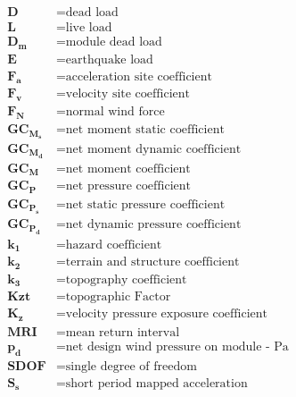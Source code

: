 \documentclass[12pt,notitle,letterpaper]{report}
\begin{document}
\vspace{-.4in}
\begingroup
\allowdisplaybreaks
\begin{align*}
    \bm{D}       & = \textrm{dead load}                               \\
    \bm{L}       & = \textrm{live load}                               \\
    \bm{D_m}     & = \textrm{module dead load}                        \\
    \bm{E}       & = \textrm{earthquake load}                         \\
    \bm{F_a}     & = \textrm{acceleration site coefficient}           \\
    \bm{F_v}     & = \textrm{velocity site coefficient}               \\
    \bm{F_N}     & = \textrm{normal wind force}                       \\
    \bm{GC_M_s}  & = \textrm{net moment static coefficient}           \\
    \bm{GC_M_d}  & = \textrm{net moment dynamic coefficient}          \\
    \bm{GC_M}    & = \textrm{net moment coefficient}                  \\
    \bm{GC_P}    & = \textrm{net pressure coefficient}                \\
    \bm{GC_P_s}  & = \textrm{net static pressure coefficient}         \\
    \bm{GC_P_d}  & = \textrm{net dynamic pressure coefficient}        \\
    \bm{k_1}     & = \textrm{hazard coefficient}                      \\
    \bm{k_2}     & = \textrm{terrain and structure coefficient}       \\
    \bm{k_3}     & = \textrm{topography coefficient}                  \\
    \bm{Kzt}     & = \textrm{topographic Factor}                      \\
    \bm{K_z}     & = \textrm{velocity pressure exposure coefficient}  \\
    \bm{MRI}     & = \textrm{mean return interval}                    \\
    \bm{p_d}     & = \textrm{net design wind pressure on module - Pa} \\
    \bm{SDOF}    & = \textrm{single degree of freedom}                \\
    \bm{S_s}     & = \textrm{short period mapped acceleration}        \\

\end{align*}
\end{document}

